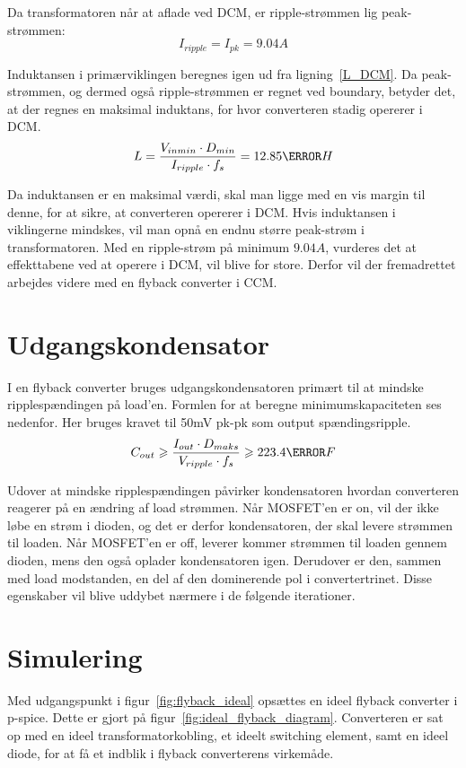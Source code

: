 \noindent Da transformatoren når at aflade ved DCM, er ripple-strømmen lig peak-strømmen:
\begin{equation} \label{DCM_ripple_current}
I_{ripple} = I_{pk} = 9.04A
\end{equation}

\noindent Induktansen i primærviklingen beregnes igen ud fra ligning~\ref{L_DCM}. Da peak-strømmen, og dermed også ripple-strømmen er regnet ved boundary, betyder det, at der regnes en maksimal induktans, for hvor converteren stadig opererer i DCM.
\begin{equation} \label{L_DCM}
L = \frac{V_{inmin} \cdot D_{min}}{I_{ripple} \cdot f_s} = 12.85\micro H
\end{equation}

\noindent Da induktansen er en maksimal værdi, skal man ligge med en vis margin til denne, for at sikre, at converteren opererer i DCM. Hvis induktansen i viklingerne mindskes, vil man opnå en endnu større peak-strøm i transformatoren. Med en ripple-strøm på minimum $9.04A$, vurderes det at effekttabene ved at operere i DCM, vil blive for store. Derfor vil der fremadrettet arbejdes videre med en flyback converter i CCM.


\section{Udgangskondensator}
I en flyback converter bruges udgangskondensatoren primært til at mindske ripplespændingen på load'en. Formlen for at beregne minimumskapaciteten ses nedenfor. Her bruges kravet til 50mV pk-pk som output spændingsripple\cite{flyback-formler}.
\begin{equation} \label{udgangskondensator}
C_{out} \geqslant \frac{I_{out} \cdot D_{maks}}{V_{ripple} \cdot f_s} \geqslant 223.4 \micro F
\end{equation}

\noindent Udover at mindske ripplespændingen påvirker kondensatoren hvordan converteren reagerer på en ændring af load strømmen. Når MOSFET'en er on, vil der ikke løbe en strøm i dioden, og det er derfor kondensatoren, der skal levere strømmen til loaden. Når MOSFET'en er off, leverer kommer strømmen til loaden gennem dioden, mens den også oplader kondensatoren igen. Derudover er den, sammen med load modstanden, en del af den dominerende pol i convertertrinet. Disse egenskaber vil blive uddybet nærmere i de følgende iterationer. 

\section{Simulering}
Med udgangspunkt i figur~\ref{fig:flyback_ideal} opsættes en ideel flyback converter i p-spice. Dette er gjort på figur~\ref{fig:ideal_flyback_diagram}. Converteren er sat op med en ideel transformatorkobling, et ideelt switching element, samt en ideel diode, for at få et indblik i flyback converterens virkemåde. 


